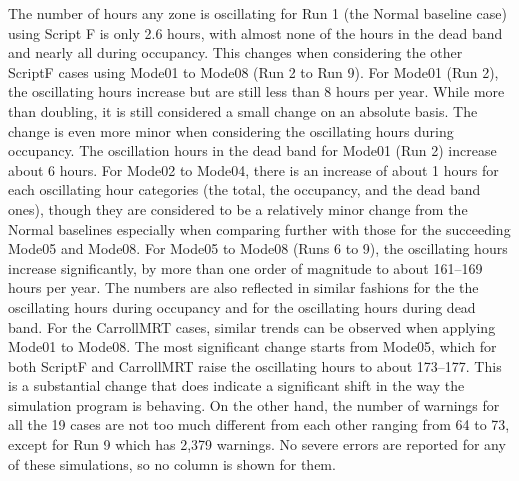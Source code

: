 The number of hours any zone is oscillating for Run 1 (the Normal baseline case) using Script F is only 2.6 hours, with almost none of the hours in the dead band and nearly all during occupancy. This changes when considering the other ScriptF cases using Mode01 to Mode08 (Run 2 to Run 9). For Mode01 (Run 2), the oscillating hours increase but are still less than 8 hours per year. While more than doubling, it is still considered a small change on an absolute basis. The change is even more minor when considering the oscillating hours during occupancy. The oscillation hours in the dead band for Mode01 (Run 2) increase about 6 hours. For Mode02 to Mode04, there is an increase of about 1 hours for each oscillating hour categories (the total, the occupancy, and the dead band ones), though they are considered to be a relatively minor change from the Normal baselines especially when comparing further with those for the succeeding Mode05 and Mode08. For Mode05 to Mode08 (Runs 6 to 9), the oscillating hours increase significantly, by more than one order of magnitude to about 161--169 hours per year. The numbers are also reflected in similar fashions for the the oscillating hours during occupancy and for the oscillating hours during dead band. For the CarrollMRT cases, similar trends can be observed when applying Mode01 to Mode08. The most significant change starts from Mode05, which for both ScriptF and CarrollMRT raise the oscillating hours to about 173--177. This is a substantial change that does indicate a significant shift in the way the simulation program is behaving. On the other hand, the number of warnings for all the 19 cases are not too much different from each other ranging from 64 to 73, except for Run 9 which has 2,379 warnings. No severe errors are reported for any of these simulations, so no column is shown for them.

